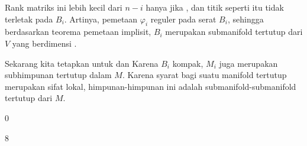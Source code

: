 {Rank matriks ini lebih kecil dari $n-i$ hanya jika
, dan titik seperti itu tidak terletak pada $B_i$. Artinya, pemetaan $\varphi_i$ reguler pada serat $B_i$, sehingga berdasarkan teorema pemetaan implisit, $B_i$ merupakan submanifold tertutup dari $V$ yang berdimensi
.

Sekarang kita tetapkan
 untuk
 dan
 Karena $B_i$ kompak, $M_i$ juga merupakan subhimpunan tertutup dalam $M$. Karena syarat bagi suatu manifold tertutup merupakan sifat lokal, himpunan-himpunan ini adalah submanifold-submanifold tertutup dari $M$.

 }



{0}

{

}
{  }



{8}

